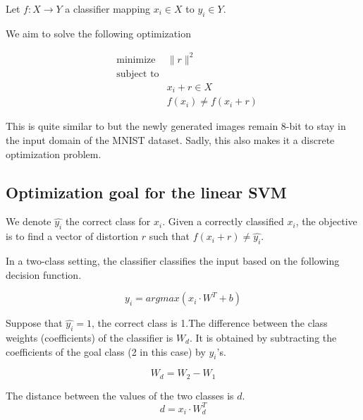 \documentclass{article} %
\begin{document}
Let \begin{math} f:X \rightarrow  Y \end{math} a classifier mapping $x_i \in
X$ to $y_i \in Y$.

We aim to solve the following optimization

\begin{equation}
\label{eq:optimization}
\begin{aligned}
& {\text{minimize}}
&   \lVert{r} \rVert^2\\
& \text{subject to} \\
& & x_i + r \in X \\
& & f(x_i) \neq f(x_i + r)
\end{aligned}
\end{equation}

This is quite similar to \citep{szegedy_intriguing_2013} but the newly
generated images remain 8-bit to stay in the input domain of the MNIST dataset.
Sadly, this also makes it a discrete optimization problem.


\subsection{Optimization goal for the linear SVM}

We denote $\widehat{y_i}$ the correct class for $x_i$. Given a correctly
classified $x_i$, the objective is to find a vector of distortion $r$ such that $f(x_i + r) \neq  \widehat{y_i}$.

In a two-class setting, the classifier classifies the input based on the following decision function.

\begin{equation}
\label{eq:decision_function}
  y_i = argmax (x_i \cdot W^T + b)
\end{equation}

Suppose that $\widehat{y_i} = 1$, the correct class is 1.The difference between the class weights (coefficients) of the classifier is $W_d$.
It is obtained by subtracting the coefficients of the goal class (2 in 
this case) by $\widehat{y_i}$'s.

\begin{equation}
\label{eq:difference}
  W_d = W_2 - W_1
\end{equation}

The distance between the values of the two classes is $d$.
\begin{equation}
\label{eq:gap}
  d = x_i \cdot W_d^T
\end{equation}
\end{document}
